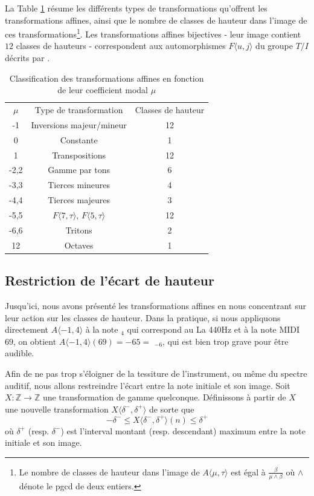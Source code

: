 \documentclass{article}
\begin{document}
La Table \ref{tab:classmu} résume les différents types de transformations qu'offrent les transformations affines, ainsi que le nombre de classes de hauteur dans l'image de ces transformations\footnote{Le nombre de classes de hauteur dans l'image de $A\langle \mu, \tau\rangle$ est égal à $\frac{\beta}{\mu\wedge \beta}$ où $\wedge$ dénote le pgcd de deux entiers.}. Les transformations affines bijectives - leur image contient $12$ classes de hauteurs - correspondent  aux automorphismes $F\langle u,j \rangle$ du groupe $T/I$ décrits par \cite{lewin1990klumpenhouwer}.


\begin{table}[htbp]
  \centering
  \begin{tabular}{ccc}
    \rowcolor{gray!50}
    $\mu$ & Type de transformation & Classes de hauteur\\
    -1 & Inversions majeur/mineur & 12\\
    0 & Constante & 1\\
    1 & Transpositions & 12 \\
    -2,2 & Gamme par tons & 6 \\
    -3,3 & Tierces mineures &4 \\
    -4,4 & Tierces majeures & 3\\
    -5,5 & $F\langle 7,\tau \rangle$, $F\langle 5,\tau \rangle$& 12 \\
    -6,6 & Tritons & 2\\
    12 & Octaves & 1
  \end{tabular}
  \caption{Classification des transformations affines en fonction de leur coefficient modal $\mu$\label{tab:classmu} }
\end{table}

\subsection{Restriction de l'écart de hauteur}
Jusqu'ici, nous avons présenté les transformations affines en nous concentrant sur leur action sur les classes de hauteur. Dans la pratique, si nous appliquons directement $A\langle -1,4 \rangle$ à la note  $_4$ qui correspond au La 440Hz et à la note MIDI $69$, on obtient $A\langle -1,4 \rangle(69)  = -65 =$ $_{-6}$, qui est bien trop grave pour être audible.

Afin de ne pas trop s'éloigner de la tessiture de l'instrument, ou même du spectre auditif, nous allons restreindre l'écart entre la note initiale et son image. Soit $X : \mathbb{Z}\rightarrow \mathbb{Z}$ une transformation de gamme quelconque. Définissons à partir de $X$ une nouvelle transformation $X\langle \delta^-, \delta^+\rangle$ de sorte que $$ - \delta^- \leq X\langle \delta^-, \delta^+\rangle(n) \leq \delta ^+$$ \noindent où $\delta^+$ (resp. $\delta^-$) est l'interval montant (resp. descendant) maximum entre la note initiale et son image.
\end{document}
